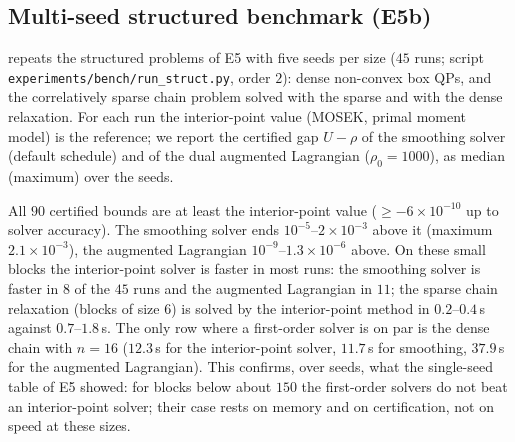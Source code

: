 \documentclass[a4paper,11pt]{article}
\newcommand{\fitbox}[1]{\sbox{\tabbox}{#1}\ifdim\wd\tabbox>\textwidth\resizebox{\textwidth}{!}{\usebox{\tabbox}}\else\usebox{\tabbox}\fi}
\theoremstyle{plain}
\theoremstyle{definition}
\theoremstyle{remark}
\begin{document}
\subsection{Multi-seed structured benchmark (E5b)}\label{sec:e5b}
 repeats the structured problems of E5 with five seeds per size ($45$ runs; script \texttt{experiments/bench/run\_struct.py}, order $2$): dense non-convex box QPs, and the correlatively sparse chain problem solved with the sparse and with the dense relaxation. For each run the interior-point value (MOSEK, primal moment model) is the reference; we report the certified gap $U-\rho$ of the smoothing solver (default schedule) and of the dual augmented Lagrangian ($\rho_0=1000$), as median (maximum) over the seeds.
\begin{table}[t]\centering\scriptsize
\setlength{\tabcolsep}{3pt}
\fitbox{}
\caption{Structured POPs, order $2$, five seeds per row. ``blocks / max'': number of PSD blocks and the largest block size; IPM: median MOSEK time; gaps: median (maximum) of $U-\rho_2$ over the seeds; times: medians (the machine is shared, load average at the start of a run $\le4.2$).}\label{tab:struct}
\end{table}
All $90$ certified bounds are at least the interior-point value ($\ge-6\times10^{-10}$ up to solver accuracy). The smoothing solver ends $10^{-5}$--$2\times10^{-3}$ above it (maximum $2.1\times10^{-3}$), the augmented Lagrangian $10^{-9}$--$1.3\times10^{-6}$ above. On these small blocks the interior-point solver is faster in most runs: the smoothing solver is faster in $8$ of the $45$ runs and the augmented Lagrangian in $11$; the sparse chain relaxation (blocks of size $6$) is solved by the interior-point method in $0.2$--$0.4$\,s against $0.7$--$1.8$\,s. The only row where a first-order solver is on par is the dense chain with $n=16$ ($12.3$\,s for the interior-point solver, $11.7$\,s for smoothing, $37.9$\,s for the augmented Lagrangian). This confirms, over seeds, what the single-seed table of E5 showed: for blocks below about $150$ the first-order solvers do not beat an interior-point solver; their case rests on memory and on certification, not on speed at these sizes.
\end{document}
